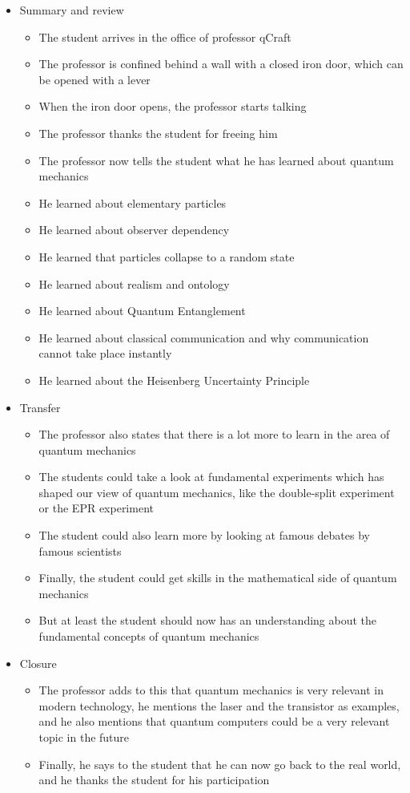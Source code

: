 \documentclass[11pt,twoside]{report} %
\begin{document}
\begin{itemize}
	\item Summary and review
	\begin{itemize}
		\item The student arrives in the office of professor qCraft
		\item The professor is confined behind a wall with a closed iron door, which can be opened with a lever
		\item When the iron door opens, the professor starts talking
		\item The professor thanks the student for freeing him
		\item The professor now tells the student what he has learned about quantum mechanics
		\item He learned about elementary particles
		\item He learned about observer dependency
		\item He learned that particles collapse to a random state
		\item He learned about realism and ontology
		\item He learned about Quantum Entanglement
		\item He learned about classical communication and why communication cannot take place instantly
		\item He learned about the Heisenberg Uncertainty Principle
	\end{itemize}
	\item Transfer
	\begin{itemize}
		\item The professor also states that there is a lot more to learn in the area of quantum mechanics
		\item The students could take a look at fundamental experiments which has shaped our view of quantum mechanics, like the double-split experiment or the EPR experiment
		\item The student could also learn more by looking at famous debates by famous scientists
		\item Finally, the student could get skills in the mathematical side of quantum mechanics
		\item But at least the student should now has an understanding about the fundamental concepts of quantum mechanics
	\end{itemize}
	\item Closure
	\begin{itemize}
		\item The professor adds to this that quantum mechanics is very relevant in modern technology, he mentions the laser and the transistor as examples, and he also mentions that quantum computers could be a very relevant topic in the future
		\item Finally, he says to the student that he can now go back to the real world, and he thanks the student for his participation
	\end{itemize}
\end{itemize}
\end{document}
